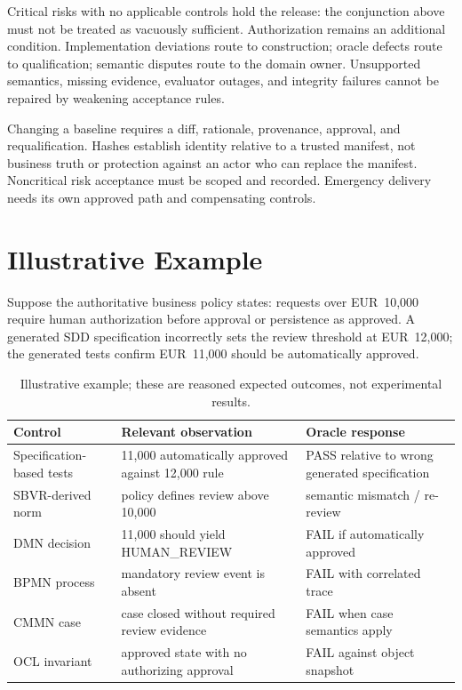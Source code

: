 \documentclass[11pt,a4paper]{article}
\newcommand{\PASS}{\textsf{PASS}}
\newcommand{\FAIL}{\textsf{FAIL}}
\begin{document}
Critical risks with no applicable controls hold the release: the conjunction above must not be treated as vacuously sufficient. Authorization remains an additional condition. Implementation deviations route to construction; oracle defects route to qualification; semantic disputes route to the domain owner. Unsupported semantics, missing evidence, evaluator outages, and integrity failures cannot be repaired by weakening acceptance rules.

Changing a baseline requires a diff, rationale, provenance, approval, and requalification. Hashes establish identity relative to a trusted manifest, not business truth or protection against an actor who can replace the manifest. Noncritical risk acceptance must be scoped and recorded. Emergency delivery needs its own approved path and compensating controls.

\section{Illustrative Example}
Suppose the authoritative business policy states: requests over EUR~10,000 require human authorization before approval or persistence as approved. A generated SDD specification incorrectly sets the review threshold at EUR~12,000; the generated tests confirm EUR~11,000 should be automatically approved.

\begin{table}[htbp]
\centering\small
\caption{Illustrative example; these are reasoned expected outcomes, not experimental results.}
\begin{tabularx}{\linewidth}{@{}p{32mm}X X@{}}
\toprule
Control & Relevant observation & Oracle response \\
\midrule
Specification-based tests & 11,000 automatically approved against 12,000 rule & \PASS{} relative to wrong generated specification \\
SBVR-derived norm & policy defines review above 10,000 & semantic mismatch / re-review \\
DMN decision & 11,000 should yield \textsf{HUMAN\_REVIEW} & \FAIL{} if automatically approved \\
BPMN process & mandatory review event is absent & \FAIL{} with correlated trace \\
CMMN case & case closed without required review evidence & \FAIL{} when case semantics apply \\
OCL invariant & approved state with no authorizing approval & \FAIL{} against object snapshot \\
\bottomrule
\end{tabularx}
\label{tab:example}
\end{table}
\end{document}

